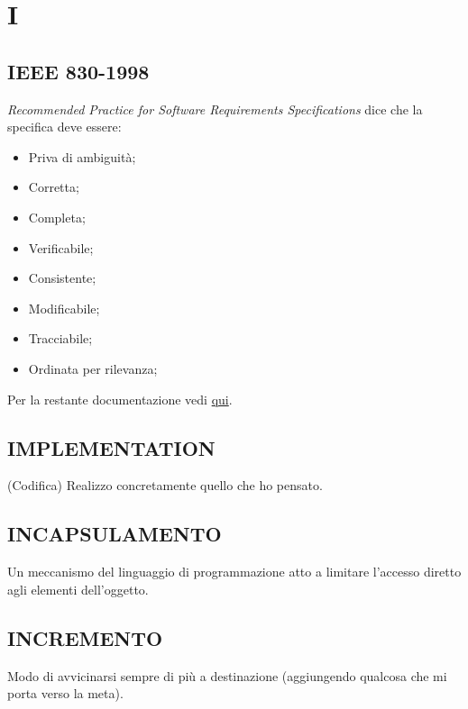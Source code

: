 \newpage
	\section{I} \label{sec:I}
	
		\subsection{IEEE 830-1998}	 \label{ieee830}
		\textit{Recommended Practice for Software Requirements Specifications} dice che la specifica deve essere:
			\begin{itemize}
				\item Priva di ambiguità;
				\item Corretta;
				\item Completa;
				\item Verificabile;
				\item Consistente;
				\item Modificabile;
				\item Tracciabile;
				\item Ordinata per rilevanza;
			\end{itemize}
		Per la restante documentazione vedi \href{https://www.cs.purdue.edu/homes/apm/courses/BITSC461-fall03/miller-guidelines/IEEE830-1998.html}{qui}.
	
		\subsection{IMPLEMENTATION}  \label{implementation}
		(Codifica) Realizzo concretamente quello che ho pensato.
		
		\subsection{INCAPSULAMENTO}  \label{incapsulamento}
		Un meccanismo del linguaggio di programmazione atto a limitare l'accesso diretto agli elementi dell'oggetto.
		
		\subsection{INCREMENTO}  \label{incremento}
		Modo di avvicinarsi sempre di più a destinazione (aggiungendo qualcosa che mi porta verso la meta).
		
